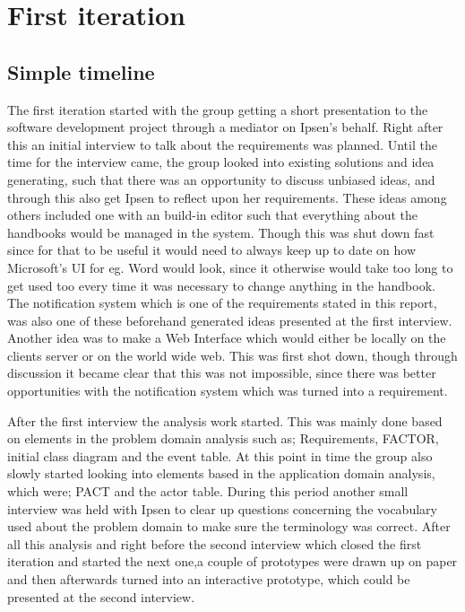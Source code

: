 \section{First iteration}\label{sec:Iteration1}
\subsection{Simple timeline}
The first iteration started with the group getting a short presentation to the software development project through a mediator on Ipsen's behalf.
Right after this an initial interview to talk about the requirements was planned.
Until the time for the interview came, the group looked into existing solutions and idea generating, such that there was an opportunity to discuss unbiased ideas, and through this also get Ipsen to reflect upon her requirements.
These ideas among others included one with an build-in editor such that everything about the handbooks would be managed in the system.
Though this was shut down fast since for that to be useful it would need to always keep up to date on how Microsoft's UI for eg. Word would look, since it otherwise would take too long to get used too every time it was necessary to change anything in the handbook.
The notification system which is one of the requirements stated in this report, was also one of these beforehand generated ideas presented at the first interview. 
Another idea was to make a Web Interface which would either be locally on the clients server or on the world wide web. This was first shot down, though through discussion it became clear that this was not impossible, since there was better opportunities with the notification system which was turned into a requirement.

After the first interview the analysis work started.
This was mainly done based on elements in the problem domain analysis such as; Requirements, FACTOR, initial class diagram and the event table.
At this point in time the group also slowly started looking into elements based in the application domain analysis, which were; PACT and the actor table.
During this period another small interview was held with Ipsen to clear up questions concerning the vocabulary used about the problem domain to make sure the terminology was correct.
After all this analysis and right before the second interview which closed the first iteration and started the next one,a couple of prototypes were drawn up on paper and then afterwards turned into an interactive prototype, which could be presented at the second interview.

